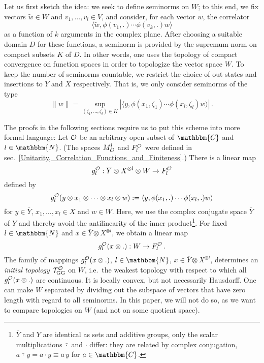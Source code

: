 \documentclass[a4paper,12pt,twoside]{article}
\renewcommand{\b}{\langle}
\renewcommand{\k}{\rangle}
\renewcommand{\c}[1]{{\cal #1}}
\newcommand{\bN}{\mathbbm{N}}
\newcommand{\bC}{\mathbbm{C}}
\newcommand{\cT}{{\cal T}}
\renewcommand{\O}{\c{O}}
\newcommand{\GG}{{\rm GG}}
\newcommand{\TGG}{\cT_{\GG}^{\O}}
\newcommand{\Fo}{F^{\O}_l}
\newcommand{\Mo}{M^l_{\O}}
\newcommand{\go}{g_l^{\O}}
\newcommand{\wt}{\tilde{w}}
\newcommand{\Yb}{\overline{Y}}
\begin{document}
Let us first sketch the idea:
we seek to define
seminorms on $W$; to this end, we fix vectors
$\wt\in W$ and $v_1,\ldots,v_l\in V$,
and consider, for each vector $w$, the correlator
$$\b\wt, \phi(v_1,.)\cdots\phi(v_k,.)w\k$$
as a function of $k$ arguments in the complex plane.
After choosing a suitable domain $D$ for these functions,
a seminorm is provided by the supremum norm on compact subsets $K$
of $D$. In other words, one uses the topology of compact
convergence on function spaces in order to topologize
the vector space $W$.
To keep the number of seminorms countable, we restrict
the choice of out-states and insertions to $Y$ and $X$
respectively. That is, we only consider
seminorms of the type
$$\|w\| = \sup_{(\zeta_1,\ldots,\zeta_l)\in K} |\b y,\phi(x_1,\zeta_1)\cdots
\phi(x_l,\zeta_l)w\k|\,.$$

The proofs in the following sections require us to put this scheme
into more formal language:
Let $\O$ be an arbitrary open subset of $\bC$ and $l\in\bN$.
(The spaces $\Mo$ and $\Fo$ were defined in  sec.\
\ref{Unitarity,_Correlation_Functions_and_Finiteness}.)
There is a linear map
$$\go: \Yb\otimes X^{\otimes l}\otimes W\to\Fo$$
defined by
$$\go(y\otimes x_1\otimes\cdots\otimes x_l\otimes w) := \b y,\phi(x_1,.)\cdots \phi(x_l,.)w\k$$
for $y\in\Yb$, $x_1,\ldots,x_l\in X$ and $w\in W$. Here, we use
the complex conjugate space $\Yb$
of $Y$ and thereby avoid the antilinearity of the inner product\footnote{$\Yb$ and $Y$ are identical
as sets and additive groups, only the scalar multiplications
$\bar{\cdot}$ and $\cdot$ differ: they are related by complex conjugation, $a\,\bar{\cdot}\,y = \overline{a}\cdot y \equiv \overline{a}\,y$
for $a\in\bC$.}.
For fixed $l\in\bN$ and
$x\in\Yb\otimes X^{\otimes l}$, we obtain a linear map
$$\go(x\otimes .): W\to\Fo\,.$$ %
The family of mappings
$\go(x\otimes .)$, $l\in\bN$, $x\in \Yb\otimes X^{\otimes l}$, determines an {\it initial
topology} $\TGG$ on $W$, i.e.\ the weakest topology with respect to which all
$\go(x\otimes .)$ are continuous. %
It is locally convex, but not necessarily
Hausdorff. One can make $W$ separated by dividing out the subspace of
vectors that have zero length with regard to all seminorms. In this paper, we will not do so, as
we want to compare topologies on $W$ (and not on some quotient space).
\end{document}
